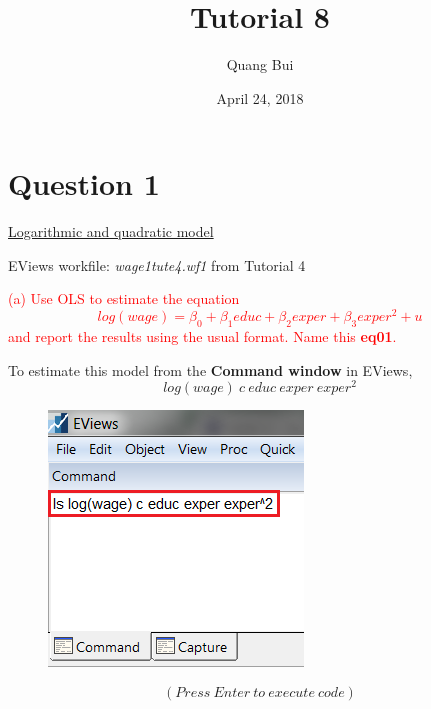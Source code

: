 \documentclass[12pt]{report}
\title{Tutorial 8}
\subtitle
{
	\textbf{keywords}: binary variables, dummy variables, intercept, slope, conditional expectation, regression line, F-test, prediction intervals, prediction uncertainty, estimation uncertainty, variation in error, sum of squared residuals, Chow test, confidence intervals, standard errors
	
	\textbf{estimated reading time}: 36 minutes
}
\author{Quang Bui}
\date{April 24, 2018}
\begin{document}
	
\maketitle

\newpage
\section*{Question 1}
\noindent \uline{Logarithmic and quadratic model}

\noindent EViews workfile: \textit{wage1tute4.wf1} from Tutorial 4

\noindent \textcolor{red}
{
	(a) Use OLS to estimate the equation
	$$log(wage) = \beta_0 + \beta_1educ + \beta_2exper + \beta_3exper^2 + u$$
	and report the results using the usual format. Name this \textbf{eq01}.
}

\noindent To estimate this model from the \textbf{Command window} in EViews,
$$log(wage)\ c\ educ\ exper\ exper^2$$
\begin{figure}[H]
	\centering
	\includegraphics{tute8_q1_1}
\end{figure}
\vspace{-\baselineskip}
\noindent $$(Press\ Enter\ to\ execute\ code)$$
\end{document}
